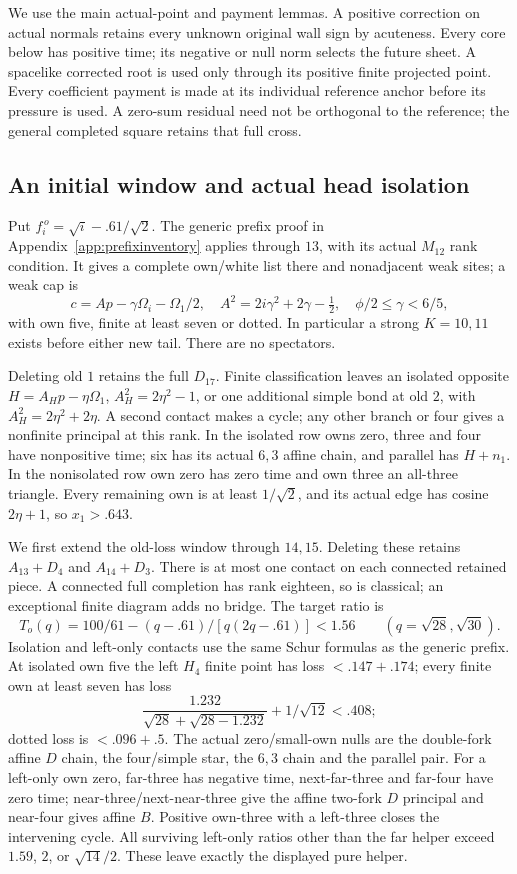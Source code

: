\documentclass[11pt]{article}
\theoremstyle{definition}
\theoremstyle{remark}
\begin{document}
We use the main actual-point and payment lemmas.
A positive correction on actual normals retains every unknown original
wall sign by acuteness. Every core below has positive time; its negative
or null norm selects the future sheet. A spacelike corrected root is
used only through its positive finite projected point.
Every coefficient payment is made at its individual reference anchor
before its pressure is used. A zero-sum residual need not be orthogonal
to the reference; the general completed square retains that full cross.

\subsection{An initial window and actual head isolation}
\label{app:D18oldhead}
Put \(f_i^{\,o}=\sqrt i-.61/\sqrt2\).
The generic prefix proof in Appendix~\ref{app:prefixinventory}
applies through \(13\), with its actual \(M_{12}\) rank condition.
It gives a complete own/white list there and nonadjacent weak sites;
a weak cap is
\[
 c=Ap-\gamma\Omega_i-\Omega_1/2,\quad
 A^2=2i\gamma^2+2\gamma-\tfrac12,\quad
 \phi/2\leq\gamma<6/5,
\]
with own five, finite at least seven or dotted.
In particular a strong \(K=10,11\) exists before either new tail.
There are no spectators.

Deleting old \(1\) retains the full \(D_{17}\).
Finite classification leaves an isolated opposite
\(H=A_Hp-\eta\Omega_1\), \(A_H^2=2\eta^2-1\),
or one additional simple bond at old \(2\),
with \(A_H^2=2\eta^2+2\eta\).
A second contact makes a cycle; any other branch or four gives a
nonfinite principal at this rank.
In the isolated row owns zero, three and four have nonpositive time;
six has its actual \(6,3\) affine chain, and parallel has \(H+n_1\).
In the nonisolated row own zero has zero time and own three an
all-three triangle. Every remaining own is at least \(1/\sqrt2\),
and its actual edge has cosine \(2\eta+1\), so \(x_1>.643\).

We first extend the old-loss window through \(14,15\).
Deleting these retains \(A_{13}+D_4\) and \(A_{14}+D_3\).
There is at most one contact on each connected retained piece.
A connected full completion has rank eighteen, so is classical;
an exceptional finite diagram adds no bridge.
The target ratio is
\[
 T_o(q)=100/61-(q-.61)/[q(2q-.61)]<1.56
 \qquad(q=\sqrt{28},\sqrt{30}).
\]
Isolation and left-only contacts use the same Schur formulas as the
generic prefix. At isolated own five the left \(H_4\) finite point
has loss \(<.147+.174\); every finite own at least seven has loss
\[
 \frac{1.232}{\sqrt{28}+\sqrt{28-1.232}}+1/\sqrt{12}<.408;
\]
dotted loss is \(<.096+.5\).
The actual zero/small-own nulls are the double-fork affine \(D\)
chain, the four/simple star, the \(6,3\) chain and the parallel pair.
For a left-only own zero, far-three has negative time, next-far-three
and far-four have zero time; near-three/next-near-three give the
affine two-fork \(D\) principal and near-four gives affine \(B\).
Positive own-three with a left-three closes the intervening cycle.
All surviving left-only ratios other than the far helper exceed
\(1.59\), \(2\), or \(\sqrt{14}/2\).
These leave exactly the displayed pure helper.
\end{document}
